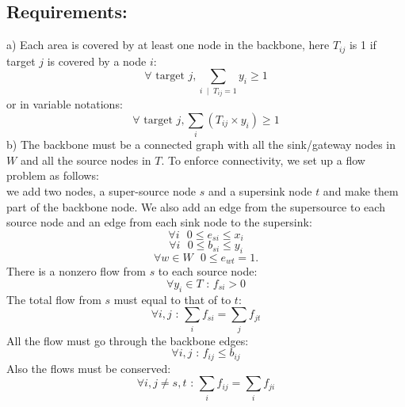 \documentclass[letterpaper, 12pt]{article}
\begin{document}
\subsection*{Requirements: }a) Each area is covered by at least one node in the
backbone, here $T_{ij}$ is 1 if target $j$ is covered by a node $i$:
\begin{equation}
	\forall \mbox{ target }j,    \sum_{i \; \mid \; T_{ij} = 1}   y_i   \geq   1
\end{equation}
or in variable notations:
\begin{equation*}
	\forall \mbox{ target }j,    \sum_i   (T_{ij} \times y_i)   \geq   1
\end{equation*}
b) The backbone must be a connected graph with all the sink/gateway nodes in $W$
and all the source nodes in $T$. To enforce connectivity, we set up a flow problem
as follows: \\
\indent we add two nodes, a super-source node $s$ and a supersink node $t$
and make them part of the backbone node. We also add an edge from the supersource to
each source node and an edge from each sink node to the supersink:
\begin{equation}
	\forall i\mbox{ } 0 \leq  e_{si} \leq x_i
\end{equation}
\begin{equation}
	\forall i\mbox{ } 0 \leq b_{si} \leq y_i
\end{equation}
\begin{equation}
 	\forall w \in W\mbox{ } 0 \leq e_{wt} = 1.
\end{equation}
{\color{red}
There is a nonzero flow from $s$ to each source
node:
\begin{equation}
	\forall y_i \in T \mbox{ : }f_{si} > 0
\end{equation}
}
The total flow from $s$ must equal to that of to $t$:
\begin{equation}
	\forall i,j \mbox{ : } \sum_i f_{si} = \sum_j f_{jt}
\end{equation} 
All the flow must go through the backbone edges:
\begin{equation}
	\forall i,j \mbox{ : }f_{ij} \leq b_{ij}
\end{equation}
Also the flows must be conserved:
\begin{equation}
	\forall i,j \neq s,t \mbox{ : } \sum_i f_{ij} = \sum_i f_{ji}
\end{equation}
\end{document}
